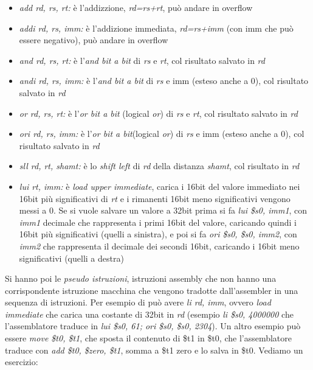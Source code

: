 \documentclass[a4paper,12pt, oneside]{book}
\begin{document}
\begin{itemize}
	\item \textit{add rd, rs, rt:} è l'addizzione, \textit{rd=rs+rt}, può andare in overflow
	\item \textit{addi rd, rs, imm:} è l'addizione immediata, \textit{rd=rs+imm} (con imm che può essere negativo), può andare in overflow
	\item \textit{and rd, rs, rt:} è l'\textit{and bit a bit} di \textit{rs} e \textit{rt}, col risultato salvato in \textit{rd}
	\item \textit{andi rd, rs, imm:} è l'\textit{and bit a bit} di \textit{rs} e imm (esteso anche a 0), col risultato salvato in \textit{rd}
	\item \textit{or rd, rs, rt:} è l'\textit{or bit a bit} (logical \textit{or}) di \textit{rs} e \textit{rt}, col risultato salvato in \textit{rd}
	\item \textit{ori rd, rs, imm:} è l'\textit{or bit a bit}(logical \textit{or}) di \textit{rs} e imm (esteso anche a 0), col risultato salvato in \textit{rd}
	\item \textit{sll rd, rt, shamt:} è lo \textit{shift left} di \textit{rd} della distanza \textit{shamt}, col risultato in \textit{rd}
	\item \textit{lui rt, imm:} è \textit{load upper immediate}, carica i 16bit del valore immediato nei 16bit più significativi di \textit{rt} e i rimanenti 16bit meno significativi vengono messi a 0. Se si vuole salvare un valore a 32bit prima si fa \textit{lui \$s0, imm1}, con \textit{imm1} decimale che rappresenta i primi 16bit del valore, caricando quindi i 16bit più significativi (quelli a sinistra), e poi si fa \textit{ori \$s0, \$s0, imm2}, con \textit{imm2} che rappresenta il decimale dei secondi 16bit, caricando i 16bit meno significativi (quelli a destra)
\end{itemize}
Si hanno poi le \textit{pseudo istruzioni}, istruzioni assembly che non hanno una corrispondente istruzione macchina che vengono tradotte dall'assembler in una sequenza di istruzioni. Per esempio di può avere \textit{li rd, imm}, ovvero \textit{load immediate} che carica una costante di 32bit in \textit{rd} (esempio \textit{li \$s0, 4000000} che l'assemblatore traduce in \textit{lui \$s0, 61; ori \$s0, \$s0, 2304}). Un altro esempio può essere \textit{move \$t0, \$t1}, che sposta il contenuto di \$t1 in \$t0, che l'assemblatore traduce con \textit{add \$t0, \$zero, \$t1}, somma a \$t1 zero e lo salva in \$t0.
Vediamo un esercizio:\\
\end{document}

